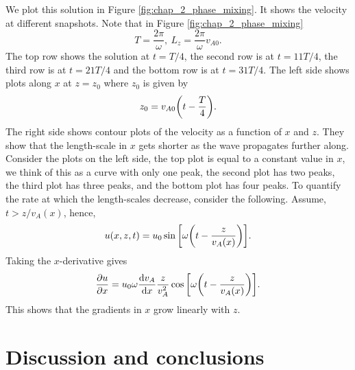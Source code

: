 We plot this solution in Figure \ref{fig:chap_2_phase_mixing}. It shows the velocity at different snapshots. Note that in Figure \ref{fig:chap_2_phase_mixing}
\[T=\frac{2\pi}{\omega},\ L_z = \frac{2\pi}{\omega}v_{A0}.\]
The top row shows the solution at $t=T/4$, the second row is at $t = 11T/4$, the third row is at $t = 21 T/4$ and the bottom row is at $t = 31 T/4$. The left side shows plots along $x$ at $z=z_0$ where $z_0$ is given by
\[z_0 = v_{A0}\qty(t - \frac{T}{4}).\]
The right side shows contour plots of the velocity as a function of $x$ and $z$. They show that the length-scale in $x$ gets shorter as the wave propagates further along. Consider the plots on the left side, the top plot is equal to a constant value in $x$, we think of this as a curve with only one peak, the second plot has two peaks, the third plot has three peaks, and the bottom plot has four peaks. To quantify the rate at which the length-scales decrease, consider the following.
Assume, $t>z/v_A(x)$, hence,
\begin{equation}
    u(x,z,t) = u_0\sin\qty[\omega\qty(t - \frac{z}{v_A(x)})].
\end{equation}
Taking the $x$-derivative gives
\begin{equation}
    \label{eq:phase_mixing_du_dx}
    \pdv{u}{x} = u_0\omega \dv{v_A}{x}\frac{z}{v_A^2}\cos\qty[\omega\qty(t - \frac{z}{v_A(x)})].
\end{equation}
This shows that the gradients in $x$ grow linearly with $z$.

\section{Discussion and conclusions}

